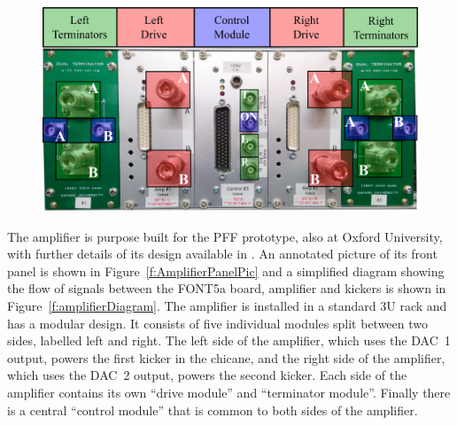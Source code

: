 \documentclass[%
 reprint,
 superscriptaddress,
 amsmath,
 amssymb,
 prstab,
]{revtex4-1}
\begin{document}
\begin{figure}
	\includegraphics[width=\columnwidth]{figs/hw/AmpPanel}%
	\caption{\label{f:AmpPanel}
	}
\end{figure}

The amplifier is purpose built for the PFF prototype, also at Oxford 
University, with further details of its design available in \cite{colinCLIC16}. 
An annotated picture of its front panel is shown in 
Figure~\ref{f:AmplifierPanelPic} and a simplified diagram showing the flow of 
signals between the FONT5a board, amplifier and kickers is shown in 
Figure~\ref{f:amplifierDiagram}.
The amplifier is installed in a standard 3U rack and has a modular design. It 
consists of five individual modules split between two sides, labelled left and 
right. The left side of the amplifier, which uses the DAC~1 output, powers the 
first kicker in the chicane, and the right side of the amplifier, which uses 
the DAC~2 output, powers the second kicker. Each side of the amplifier contains 
its own ``drive module'' and ``terminator module''. Finally there is a central 
``control module'' that is common to both sides of the amplifier.
\end{document}
